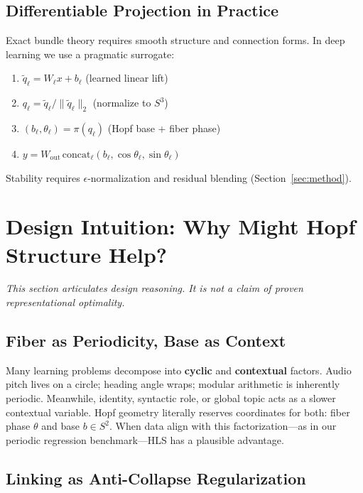 \documentclass[11pt,twocolumn]{article}
\begin{document}
\subsection{Differentiable Projection in Practice}

Exact bundle theory requires smooth structure and connection forms. In deep learning we use a pragmatic surrogate:
\begin{enumerate}[leftmargin=*, nosep]
  \item $\tilde{q}_\ell = W_\ell x + b_\ell$ (learned linear lift)
  \item $q_\ell = \tilde{q}_\ell / \|\tilde{q}_\ell\|_2$ (normalize to $S^3$)
  \item $(b_\ell, \theta_\ell) = \pi(q_\ell)$ (Hopf base + fiber phase)
  \item $y = W_{\mathrm{out}} \,\mathrm{concat}_\ell(b_\ell, \cos\theta_\ell, \sin\theta_\ell)$
\end{enumerate}
Stability requires $\epsilon$-normalization and residual blending (Section~\ref{sec:method}).

\section{Design Intuition: Why Might Hopf Structure Help?}
\label{sec:intuition}

\emph{This section articulates design reasoning. It is not a claim of proven representational optimality.}

\subsection{Fiber as Periodicity, Base as Context}

Many learning problems decompose into \textbf{cyclic} and \textbf{contextual} factors. Audio pitch lives on a circle; heading angle wraps; modular arithmetic is inherently periodic. Meanwhile, identity, syntactic role, or global topic acts as a slower contextual variable. Hopf geometry literally reserves coordinates for both: fiber phase $\theta$ and base $b\in S^2$. When data align with this factorization---as in our periodic regression benchmark---HLS has a plausible advantage.

\subsection{Linking as Anti-Collapse Regularization}
\end{document}
